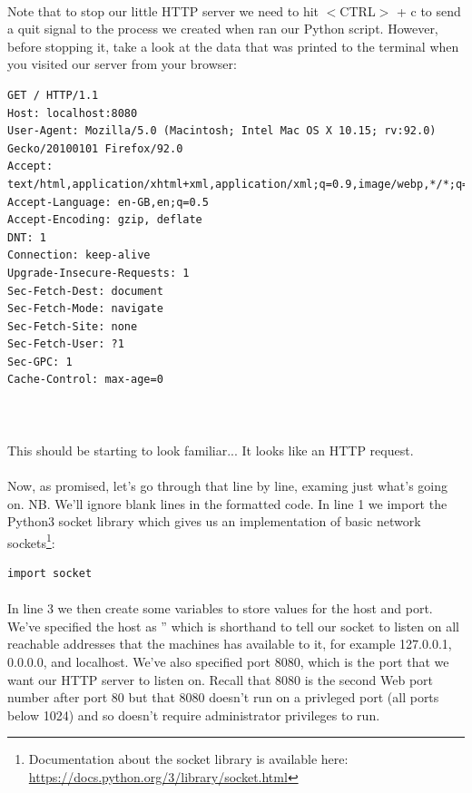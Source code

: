 \paragraph{} Note that to stop our little HTTP server we need to hit $<$CTRL$>$ + c to send a quit signal to the process we created when ran our Python script. However, before stopping it, take a look at the data that was printed to the terminal when you visited our server from your browser:

\begin{lstlisting}[style=DOS]
GET / HTTP/1.1
Host: localhost:8080
User-Agent: Mozilla/5.0 (Macintosh; Intel Mac OS X 10.15; rv:92.0) Gecko/20100101 Firefox/92.0
Accept: text/html,application/xhtml+xml,application/xml;q=0.9,image/webp,*/*;q=0.8
Accept-Language: en-GB,en;q=0.5
Accept-Encoding: gzip, deflate
DNT: 1
Connection: keep-alive
Upgrade-Insecure-Requests: 1
Sec-Fetch-Dest: document
Sec-Fetch-Mode: navigate
Sec-Fetch-Site: none
Sec-Fetch-User: ?1
Sec-GPC: 1
Cache-Control: max-age=0



\end{lstlisting}

\paragraph{} This should be starting to look familiar... It looks like an HTTP request.


\paragraph{} Now, as promised, let's go through that line by line, examing just what's going on. NB. We'll ignore blank lines in the formatted code. In line 1 we import the Python3 socket library which gives us an implementation of basic network sockets\footnote{Documentation about the socket library is available here: \url{https://docs.python.org/3/library/socket.html}}:

\begin{lstlisting}[style=CODE]
import socket
\end{lstlisting}

\paragraph{} In line 3 we then create some variables to store values for the host and port. We've specified the host as '' which is shorthand to tell our socket to listen on all reachable addresses that the machines has available to it, for example 127.0.0.1, 0.0.0.0, and localhost. We've also specified port 8080, which is the port that we want our HTTP server to listen on. Recall that 8080 is the second Web port number after port 80 but that 8080 doesn't run on a privleged port (all ports below 1024) and so doesn't require administrator privileges to run.

